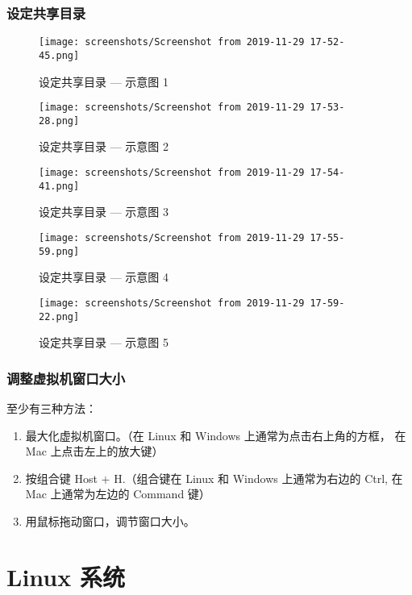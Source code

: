 \documentclass[cn,11pt, simple]{elegantbook}
\begin{document}
\subsubsection{设定共享目录}%
\label{ssub:virtualbox-tip-share-folder}
\begin{figure}[!htbp]
  \centering
  \texttt{[image: screenshots/Screenshot from
  2019-11-29 17-52-45.png]}
  \caption{设定共享目录 --- 示意图 1}
\end{figure}
\begin{figure}[!htbp]
  \centering
  \texttt{[image: screenshots/Screenshot from
  2019-11-29 17-53-28.png]}
  \caption{设定共享目录 --- 示意图 2}
\end{figure}
\begin{figure}[!htbp]
  \centering
  \texttt{[image: screenshots/Screenshot from
  2019-11-29 17-54-41.png]}
  \caption{设定共享目录 --- 示意图 3}
\end{figure}
\begin{figure}[!htbp]
  \centering
  \texttt{[image: screenshots/Screenshot from
  2019-11-29 17-55-59.png]}
  \caption{设定共享目录 --- 示意图 4}
\end{figure}
\begin{figure}[!htbp]
  \centering
  \texttt{[image: screenshots/Screenshot from
  2019-11-29 17-59-22.png]}
  \caption{设定共享目录 --- 示意图 5}
\end{figure}

\newpage
\subsubsection{调整虚拟机窗口大小}%
\label{ssub:virtualbox-tip-window-size}

至少有三种方法：
\begin{enumerate}
    \item 最大化虚拟机窗口。（在 Linux 和 Windows 上通常为点击右上角的方框，
        在 Mac 上点击左上的放大键）
    \item 按组合键 Host + H.（组合键在 Linux 和 Windows 上通常为右边的
        Ctrl, 在 Mac 上通常为左边的 Command 键）
    \item 用鼠标拖动窗口，调节窗口大小。
\end{enumerate}

\section{Linux 系统}%
\label{sec:linux-tips}
\end{document}
